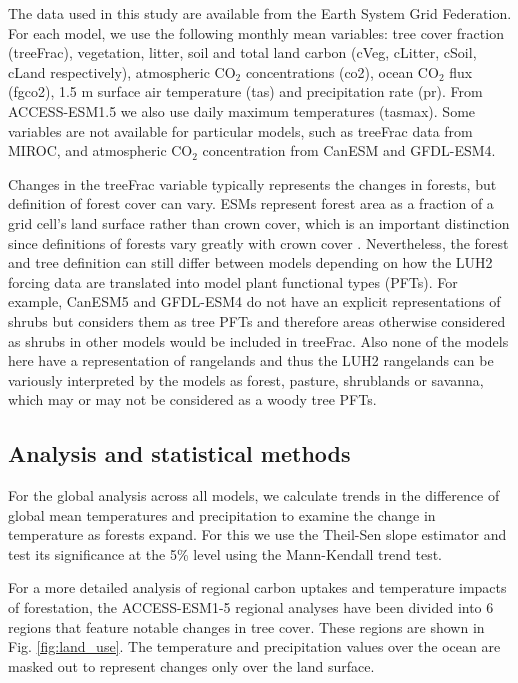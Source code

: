 \documentclass[]{article}
\begin{document}
The data used in this study are available from the Earth System Grid Federation.
For each model, we use the following monthly mean variables: tree cover fraction (treeFrac), vegetation, litter, soil and total land carbon (cVeg, cLitter, cSoil, cLand respectively), atmospheric CO$_2$ concentrations (co2), ocean CO$_2$ flux (fgco2), 1.5 m surface air temperature (tas) and precipitation rate (pr).
From ACCESS-ESM1.5 we also use daily maximum temperatures (tasmax).
Some variables are not available for particular models, such as treeFrac data from MIROC, and atmospheric CO$_2$ concentration from CanESM and GFDL-ESM4.

Changes in the treeFrac variable typically represents the changes in forests, but definition of forest cover can vary.
ESMs represent forest area as a fraction of a grid cell's land surface rather than crown cover, which is an important distinction since definitions of forests vary greatly with crown cover \parencite{zomer_land_2008}.
Nevertheless, the forest and tree definition can still differ between models depending on how the LUH2 forcing data are translated into model plant functional types (PFTs).
For example, CanESM5 and GFDL-ESM4 do not have an explicit representations of shrubs but considers them as tree PFTs and therefore areas otherwise considered as shrubs in other models would be included in treeFrac.
Also none of the models here have a representation of rangelands and thus the LUH2 rangelands can be variously interpreted by the models as forest, pasture, shrublands or savanna, which may or may not be considered as a woody tree PFTs.

\subsection{Analysis and statistical methods}

For the global analysis across all models, we calculate trends in the difference of global mean temperatures and precipitation to examine the change in temperature as forests expand.
For this we use the Theil-Sen slope estimator and test its significance at the 5\% level using the Mann-Kendall trend test.

For a more detailed analysis of regional carbon uptakes and temperature impacts of forestation, the ACCESS-ESM1-5 regional analyses have been divided into 6 regions that feature notable changes in tree cover.
These regions are shown in Fig. \ref{fig:land_use}.
The temperature and precipitation values over the ocean are masked out to represent changes only over the land surface.
\end{document}
